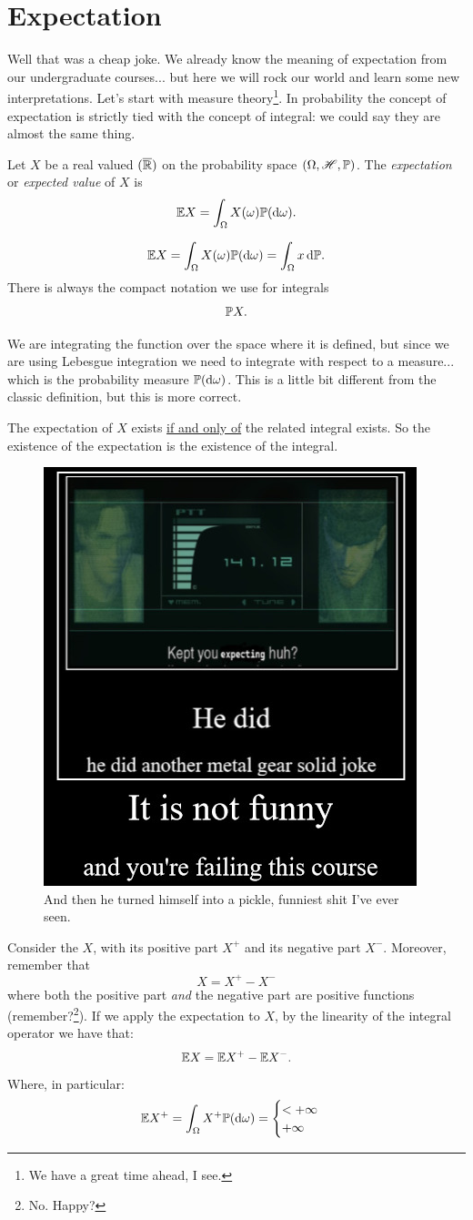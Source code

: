 \documentclass{report}
\begin{document}
\section{Expectation}
Well that was a cheap joke. We already know the meaning of expectation from our undergraduate courses... but here we will rock our world and learn some new interpretations. Let's start with measure theory\footnote{We have a great time ahead, I see.}. In probability the concept of expectation is strictly tied with the concept of integral: we could say they are almost the same thing.
\begin{definition}
	Let $X$ be a real valued $(\overline{\mathbb{R}})$ \rv{} on the probability space $(\Omega,\mathscr{H},\mathbb{P})$. The \emph{expectation} or \emph{expected value} of $X$ is
	\[\mathbb{E} X=\int_\Omega X(\omega)\mathbb{P}(\mathop{}\!\mathrm{d}\omega).\]
\end{definition}
	\begin{notation}
		\[\mathbb{E} X=\int_\Omega X(\omega)\mathbb{P}(\mathop{}\!\mathrm{d}\omega)=\int_\Omega x\mathop{}\!\mathrm{d}\mathbb{P}.\]
		There is always the compact notation we use for integrals
		\[\mathbb{P} X.\]
	\end{notation}
We are integrating the function over the space where it is defined, but since we are using Lebesgue integration we need to integrate with respect to a measure... which is the probability measure $\mathbb{P}(\mathop{}\!\mathrm{d}\omega)$. This is a little bit different from the classic definition, but this is more correct.
\begin{remark}
	The expectation of $X$ exists \underline{if and only of} the related integral exists. So the existence of the expectation is the existence of the integral.\\
\end{remark}
\begin{figure}
	\centering
	\includegraphics[width=0.\textwidth]{kept3}
	\caption{And then he turned himself into a pickle, funniest shit I've ever seen.}
	\label{fig:kept3}
\end{figure}
Consider the \rv{} $X$, with its positive part $X^+$ and its negative part $X^-$. Moreover, remember that 
\[X=X^+-X^-\]
where both the positive part \textit{and} the negative part are positive functions (remember?\footnote{No. Happy?}). If we apply the expectation to $X$, by the linearity of the integral operator we have that:
\[\mathbb{E} X=\mathbb{E} X^+-\mathbb{E} X^-.\]
Where, in particular:
\[\mathbb{E} X^+=\int_\Omega X^+\mathbb{P}(\mathop{}\!\mathrm{d}\omega)=\begin{cases}
	<+\infty\\
	+\infty
\end{cases}\]
\end{document}
